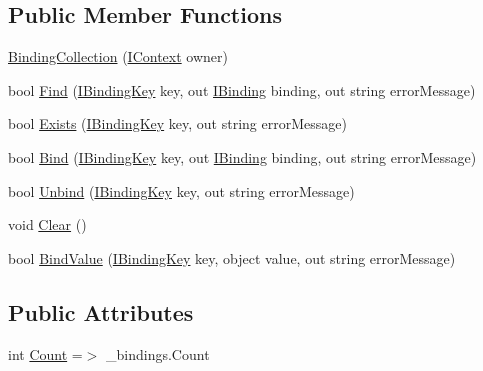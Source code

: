 \subsection*{Public Member Functions}
\begin{DoxyCompactItemize}
\item 
\mbox{\hyperlink{classcp_games_1_1core_1_1_rapid_m_v_c_1_1src_1_1_binding_collection_afa9558a65905fb3094e0d7f68d8a689e}{Binding\+Collection}} (\mbox{\hyperlink{interfacecp_games_1_1core_1_1_rapid_m_v_c_1_1_i_context}{I\+Context}} owner)
\item 
bool \mbox{\hyperlink{classcp_games_1_1core_1_1_rapid_m_v_c_1_1src_1_1_binding_collection_a7d08f6f549f95ec651486e5295f985c8}{Find}} (\mbox{\hyperlink{interfacecp_games_1_1core_1_1_rapid_m_v_c_1_1_i_binding_key}{I\+Binding\+Key}} key, out \mbox{\hyperlink{interfacecp_games_1_1core_1_1_rapid_m_v_c_1_1_i_binding}{I\+Binding}} binding, out string error\+Message)
\item 
bool \mbox{\hyperlink{classcp_games_1_1core_1_1_rapid_m_v_c_1_1src_1_1_binding_collection_ac8b4fb2a303f8c8755d36bf90d989453}{Exists}} (\mbox{\hyperlink{interfacecp_games_1_1core_1_1_rapid_m_v_c_1_1_i_binding_key}{I\+Binding\+Key}} key, out string error\+Message)
\item 
bool \mbox{\hyperlink{classcp_games_1_1core_1_1_rapid_m_v_c_1_1src_1_1_binding_collection_a766bda0a58edf276bb1eaf3185fa6317}{Bind}} (\mbox{\hyperlink{interfacecp_games_1_1core_1_1_rapid_m_v_c_1_1_i_binding_key}{I\+Binding\+Key}} key, out \mbox{\hyperlink{interfacecp_games_1_1core_1_1_rapid_m_v_c_1_1_i_binding}{I\+Binding}} binding, out string error\+Message)
\item 
bool \mbox{\hyperlink{classcp_games_1_1core_1_1_rapid_m_v_c_1_1src_1_1_binding_collection_a09aab47e05fb2aac72f9dbcb4797a6c2}{Unbind}} (\mbox{\hyperlink{interfacecp_games_1_1core_1_1_rapid_m_v_c_1_1_i_binding_key}{I\+Binding\+Key}} key, out string error\+Message)
\item 
void \mbox{\hyperlink{classcp_games_1_1core_1_1_rapid_m_v_c_1_1src_1_1_binding_collection_a7c3b2155a17bdb3f1d94a1e003fbb3c7}{Clear}} ()
\item 
bool \mbox{\hyperlink{classcp_games_1_1core_1_1_rapid_m_v_c_1_1src_1_1_binding_collection_afb78998cb899e8a918b654505d521f7b}{Bind\+Value}} (\mbox{\hyperlink{interfacecp_games_1_1core_1_1_rapid_m_v_c_1_1_i_binding_key}{I\+Binding\+Key}} key, object value, out string error\+Message)
\end{DoxyCompactItemize}
\subsection*{Public Attributes}
\begin{DoxyCompactItemize}
\item 
int \mbox{\hyperlink{classcp_games_1_1core_1_1_rapid_m_v_c_1_1src_1_1_binding_collection_a5454192af90004d395e9e80a75adaf98}{Count}} =$>$ \+\_\+bindings.\+Count
\end{DoxyCompactItemize}

